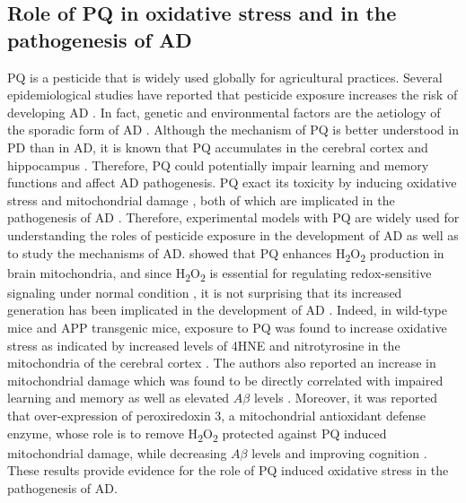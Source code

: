 \subsection{Role of PQ in oxidative stress and in the pathogenesis of AD}
PQ is a pesticide that is widely used globally for agricultural practices. Several epidemiological studies have reported that pesticide exposure increases the risk of developing AD \citep{Baldi2003,Hayden2010,Santibanez2007,Yan2016}. In fact, genetic and environmental factors are the aetiology of the sporadic form of AD \citep{Landrigan2005}. Although the mechanism of PQ is better understood in PD than in AD, it is known that PQ accumulates in the cerebral cortex and hippocampus \citep{Landrigan2005}. Therefore, PQ could potentially impair learning and memory functions and affect AD pathogenesis. PQ exact its toxicity by inducing oxidative stress and mitochondrial damage \citep{Baltazar2014,Drechsel2008,Lin2006}, both of which are implicated in the pathogenesis of AD \citep{Lin2006}. Therefore, experimental models with PQ are widely used for understanding the roles of pesticide exposure in the development of AD as well as to study the mechanisms of AD. \citet{Drechsel2008} showed that PQ enhances H\textsubscript{2}O\textsubscript{2} production in brain mitochondria, and since H\textsubscript{2}O\textsubscript{2} is essential for regulating redox-sensitive signaling under normal condition \citep{Rhee2006}, it is not surprising that its increased generation has been implicated in the development of AD \citep{Du2008,Manczak2006}. Indeed, in wild-type mice and APP transgenic mice, exposure to PQ was found to increase oxidative stress as indicated by increased levels of 4HNE and nitrotyrosine in the mitochondria of the cerebral cortex \citep{Chen2012}. The authors also reported an increase in mitochondrial damage which was found to be directly correlated with impaired learning and memory as well as elevated $A\beta$ levels \citep{Chen2012}. Moreover, it was reported that over-expression of peroxiredoxin 3, a mitochondrial antioxidant defense enzyme, whose role is to remove H\textsubscript{2}O\textsubscript{2} protected against PQ induced mitochondrial damage, while decreasing $A\beta$ levels and improving cognition \citep{Chen2012}. These results provide evidence for the role of PQ induced oxidative stress in the pathogenesis of AD.

